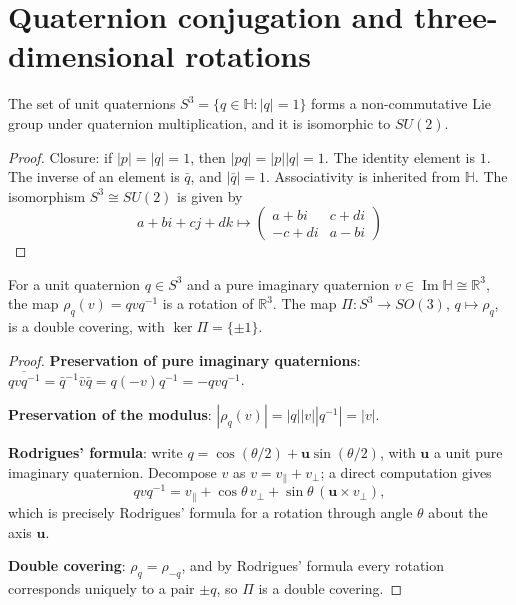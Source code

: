 \section{Quaternion conjugation and three-dimensional rotations}

\begin{theorem}\label{thm:q_unit_sphere}
The set of unit quaternions $S^3=\{q\in\mathbb{H}:|q|=1\}$ forms a non-commutative Lie group under quaternion multiplication, and it is isomorphic to $SU(2)$.
\end{theorem}

\begin{proof}
Closure: if $|p|=|q|=1$, then $|pq|=|p||q|=1$. The identity element is $1$. The inverse of an element is $\bar q$, and $|\bar q|=1$. Associativity is inherited from $\mathbb{H}$. The isomorphism $S^3\cong SU(2)$ is given by
\[
a+bi+cj+dk\longmapsto
\begin{pmatrix}
a+bi & c+di\\
-c+di & a-bi
\end{pmatrix}
\]
\end{proof}

\begin{theorem}\label{thm:q_rotation}
For a unit quaternion $q\in S^3$ and a pure imaginary quaternion $v\in\operatorname{Im}\mathbb{H}\cong\mathbb{R}^3$, the map $\rho_q(v)=q v q^{-1}$ is a rotation of $\mathbb{R}^3$. The map $\Pi:S^3\to SO(3)$, $q\mapsto\rho_q$, is a double covering, with $\ker\Pi=\{\pm 1\}$.
\end{theorem}

\begin{proof}
\textbf{Preservation of pure imaginary quaternions}: $\overline{qvq^{-1}}=\bar q^{-1}\bar v\bar q=q(-v)q^{-1}=-qvq^{-1}$.

\textbf{Preservation of the modulus}: $|\rho_q(v)|=|q||v||q^{-1}|=|v|$.

\textbf{Rodrigues' formula}: write $q=\cos(\theta/2)+\mathbf{u}\sin(\theta/2)$, with $\mathbf{u}$ a unit pure imaginary quaternion. Decompose $v$ as $v=v_\parallel+v_\perp$; a direct computation gives
\[
qvq^{-1}=v_\parallel+\cos\theta\,v_\perp+\sin\theta\,(\mathbf{u}\times v_\perp),
\]
which is precisely Rodrigues' formula for a rotation through angle $\theta$ about the axis $\mathbf{u}$.

\textbf{Double covering}: $\rho_q=\rho_{-q}$, and by Rodrigues' formula every rotation corresponds uniquely to a pair $\pm q$, so $\Pi$ is a double covering.
\end{proof}

